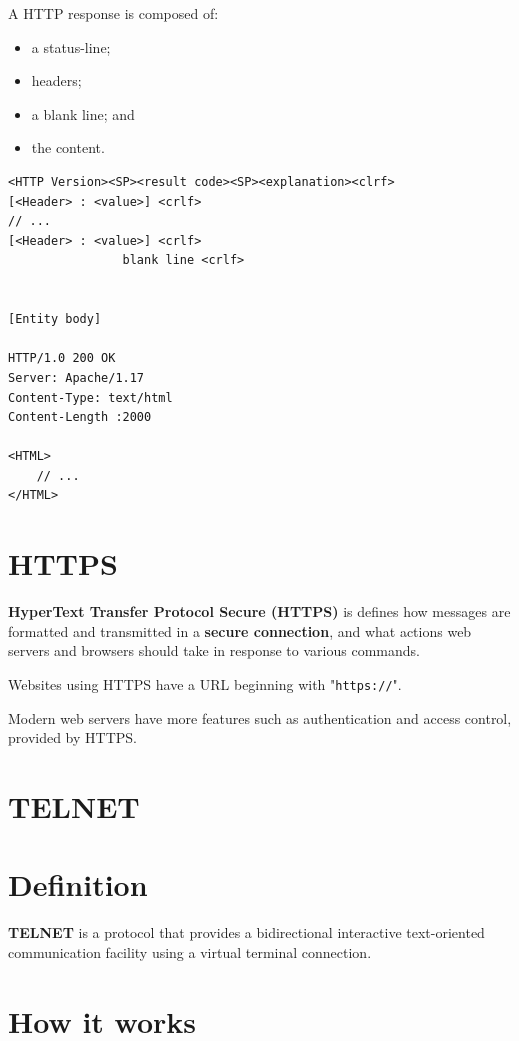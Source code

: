 \documentclass[a4paper]{systems-software}
\begin{document}
A HTTP response is composed of:
\begin{itemize}
	\item a status-line;
	\item headers;
	\item a blank line; and
	\item the content.
\end{itemize}

\begin{lstlisting}[title={Example HTTP response.}]
<HTTP Version><SP><result code><SP><explanation><clrf>
[<Header> : <value>] <crlf>
// ...
[<Header> : <value>] <crlf>
				blank line <crlf>
				

[Entity body]
			
HTTP/1.0 200 OK
Server: Apache/1.17
Content-Type: text/html
Content-Length :2000

<HTML>
	// ...
</HTML>	
\end{lstlisting}


\newpage

\section*{HTTPS}

\textbf{HyperText Transfer Protocol Secure (HTTPS)} is defines how messages are formatted and transmitted in a \textbf{secure connection}, and what actions web servers and browsers should take in response to various commands.

Websites using HTTPS have a URL beginning with "\texttt{https://}".

Modern web servers have more features such as authentication and access control, provided by HTTPS.


\section{TELNET}

\section*{Definition}

\textbf{TELNET} is a protocol that provides a bidirectional interactive text-oriented communication facility using a virtual terminal connection.


\section*{How it works}
\end{document}
